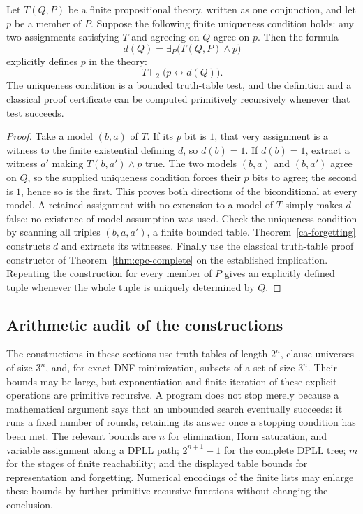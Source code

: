 \begin{theorem}\label{ca-beth}
Let $T(Q,P)$ be a finite propositional theory, written as one conjunction,
and let $p$ be a member of $P$.  Suppose the following finite uniqueness
condition holds: any two assignments satisfying $T$ and agreeing on $Q$
agree on $p$.  Then the formula
\[
 d(Q)=\exists_P\bigl(T(Q,P)\wedge p\bigr)
\]
explicitly defines $p$ in the theory:
\[
 T\models_2\bigl(p\leftrightarrow d(Q)\bigr).
\]
The uniqueness condition is a bounded truth-table test, and the definition
and a classical proof certificate can be computed primitively recursively
whenever that test succeeds.
\end{theorem}
\begin{proof}
Take a model $(b,a)$ of $T$.  If its $p$ bit is $1$, that very assignment
is a witness to the finite existential defining $d$, so $d(b)=1$.  If
$d(b)=1$, extract a witness $a'$ making $T(b,a')\wedge p$ true.  The two
models $(b,a)$ and $(b,a')$ agree on $Q$, so the supplied uniqueness condition
forces their $p$ bits to agree; the second is $1$, hence so is the first.
This proves both directions of the biconditional at every model.  A retained
assignment with no extension to a model of $T$ simply makes $d$ false; no
existence-of-model assumption was used.  Check the uniqueness condition by
scanning all triples $(b,a,a')$, a finite bounded table.  Theorem~\ref{ca-forgetting}
constructs $d$ and extracts its witnesses.  Finally use the classical
truth-table proof constructor of Theorem~\ref{thm:cpc-complete} on the
established implication.  Repeating
the construction for every member of $P$ gives an explicitly defined tuple
whenever the whole tuple is uniquely determined by $Q$.
\end{proof}

\subsection{Arithmetic audit of the constructions}
\label{ca-audit}

The constructions in these sections use truth tables of length $2^n$, clause
universes of size $3^n$, and, for exact DNF minimization, subsets of a set of
size $3^n$.  Their bounds may be large, but exponentiation and finite
iteration of these explicit operations are primitive recursive.  A program
does not stop merely because a mathematical argument says that an unbounded
search eventually succeeds: it runs a fixed number of rounds, retaining its
answer once a stopping condition has been met.  The relevant bounds are
$n$ for elimination, Horn saturation, and variable assignment along a DPLL
path; $2^{n+1}-1$ for the complete DPLL tree; $m$ for the stages of finite
reachability; and the displayed table bounds for representation and
forgetting.  Numerical encodings of the finite lists may enlarge these bounds
by further primitive recursive functions without changing the conclusion.

